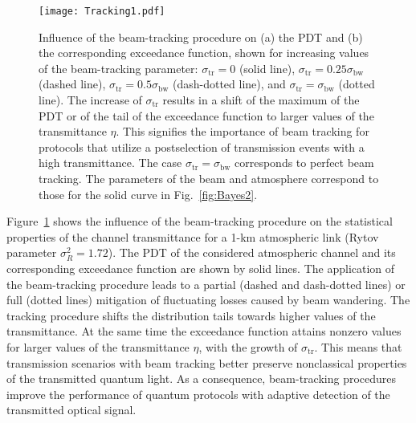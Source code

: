 \documentclass[aps,pra,twocolumn,a4paper,nofootinbib,preprintnumbers] {revtex4-1}
\begin{document}
\begin{figure}[ht]
 \texttt{[image: Tracking1.pdf]}
 \caption{\label{fig:Tracking} Influence of the beam-tracking procedure on (a) the  PDT   and (b) the corresponding exceedance function, shown for  increasing values of the beam-tracking parameter: $\sigma_\mathrm{tr}{=}0$ (solid line), $\sigma_\mathrm{tr}{=}0.25\sigma_\mathrm{bw}$ (dashed line),  $\sigma_\mathrm{tr}{=}0.5\sigma_\mathrm{bw}$ (dash-dotted line), and $\sigma_\mathrm{tr}{=}\sigma_\mathrm{bw}$ (dotted line).
 The increase of  $\sigma_\mathrm{tr}$ results in a shift  of the maximum of the PDT or of the tail of the exceedance function to larger values of the transmittance $\eta$.
 This signifies the importance of beam tracking for protocols that utilize a  postselection of transmission events with a high transmittance.
 The case $\sigma_\mathrm{tr}{=}\sigma_\mathrm{bw}$ corresponds to perfect beam tracking.
 The  parameters of the beam and atmosphere correspond to those for the  solid curve in Fig.~\ref{fig:Bayes2}.
 }
\end{figure}

      Figure~\ref{fig:Tracking} shows the influence of the beam-tracking procedure on the statistical properties of the channel transmittance for a 1-km atmospheric link (Rytov parameter $\sigma_R^2{=}1.72$).
      The PDT of the considered atmospheric channel  and its  corresponding exceedance function are shown by solid lines.
      The application of the beam-tracking procedure  leads to a partial (dashed and dash-dotted lines) or full (dotted lines) mitigation of fluctuating losses caused by beam wandering.
      The tracking procedure  shifts the distribution tails  towards higher values of the transmittance.
      At the same time the exceedance function attains nonzero values for larger values of the transmittance $\eta$, with the growth of $\sigma_{\mathrm{tr}}$.
      This means that transmission scenarios with beam tracking better preserve nonclassical properties of the transmitted quantum light.
      As a consequence, beam-tracking  procedures improve the performance of quantum protocols with adaptive detection of the transmitted optical signal.
\end{document}
